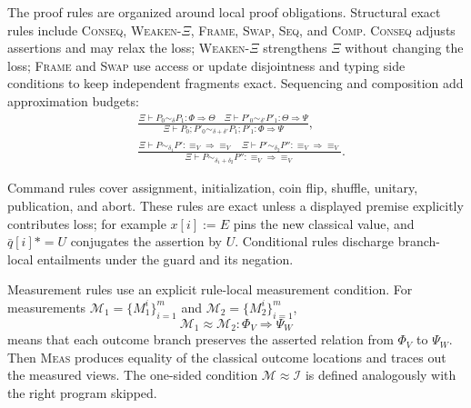 \documentclass[conference,compsoc]{IEEEtran}
\newenvironment{tightdisplay}{%
  \begingroup
  \setlength{\arraycolsep}{2pt}%
  \[
}{%
  \]
  \endgroup
}
\newcommand{\asteq}{\mathrel{*\!=}}
\begin{document}
The proof rules are organized around local proof obligations. Structural exact
rules include \textsc{Conseq}, \textsc{Weaken-\(\Xi\)}, \textsc{Frame}, \textsc{Swap},
\textsc{Seq}, and \textsc{Comp}. \textsc{Conseq} adjusts assertions and may relax the
loss; \textsc{Weaken-\(\Xi\)} strengthens \(\Xi\) without changing the loss; \textsc{Frame} and
\textsc{Swap} use access or update disjointness and typing side conditions to keep independent fragments exact.
Sequencing and composition add approximation budgets:
\begin{tightdisplay}
\begin{aligned}
&\frac{\Xi\vdash P_0\sim_\delta P_1:\Phi\Rightarrow\Theta\quad
\Xi\vdash P'_0\sim_{\delta'}P'_1:\Theta\Rightarrow\Psi}
{\Xi\vdash
P_0;P'_0\sim_{\delta+\delta'}P_1;P'_1:\Phi\Rightarrow\Psi},\\
&\frac{\Xi\vdash P\sim_{\delta_1}P':\equiv_V\Rightarrow\equiv_V\quad
\Xi\vdash P'\sim_{\delta_2}P'':\equiv_V\Rightarrow\equiv_V}
{\Xi\vdash
P\sim_{\delta_1+\delta_2}P'':\equiv_V\Rightarrow\equiv_V}.
\end{aligned}
\end{tightdisplay}

Command rules cover assignment, initialization, coin flip, shuffle, unitary,
publication, and abort. These rules are exact unless a displayed premise
explicitly contributes loss; for example \(x[i]:=E\) pins the new classical
value, and \(\bar q[i]\asteq U\) conjugates the assertion by \(U\). Conditional
rules discharge branch-local entailments under the guard and its negation.

Measurement rules use an explicit rule-local measurement condition. For measurements \(\mathcal M_1=\{M_1^i\}_{i=1}^m\) and \(\mathcal M_2=\{M_2^i\}_{i=1}^m\),
\[
\mathcal M_1\approx\mathcal M_2:\Phi_V\Longrightarrow\Psi_W
\]
means that each outcome branch preserves the asserted relation from \(\Phi_V\) to \(\Psi_W\). Then \textsc{Meas} produces equality of the classical outcome locations and traces out the measured views. The one-sided condition \(\mathcal M\approx\mathcal I\) is defined analogously with the right program skipped.
\end{document}
